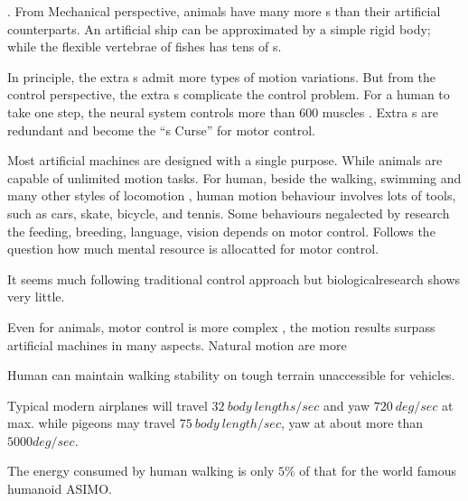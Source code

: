 \begin{itemize}
.
From Mechanical perspective, animals have many more {\dof}s than their artificial counterparts.
An artificial ship can be approximated by a simple rigid body; while the flexible vertebrae of fishes has tens of {\dof}s.


In principle, the extra {\dof}s admit more types of motion variations. 
But from the control perspective, the extra {\dof}s complicate the control problem. 
For a human to take one step,  the neural system controls more than 600 muscles .
Extra {\dof}s are redundant and become the ``{\dof}s Curse'' for motor control.
 
Most artificial machines are designed with a single purpose.
While animals are capable  of unlimited motion tasks.
For human, beside the walking, swimming and many other styles of locomotion , human motion behaviour involves lots of tools, such as cars, skate, bicycle, and tennis.
Some behaviours negalected by \cms research the feeding, breeding, language, vision depends on motor control. 
Follows the question how much mental resource is allocatted for motor control.

It seems much following traditional control approach but biologicalresearch shows very little.

Even for animals,  motor control is more complex , the motion results surpass artificial machines in many aspects.
Natural motion are more
\begin{enumerate} 

Human can maintain walking stability on tough terrain unaccessible for vehicles.

Typical modern airplanes will travel $32\: body\: lengths/sec$ and yaw $720\: deg/sec$ at max.
while pigeons may travel $75 \:body\: length / sec$, yaw at about more than $5000deg/sec$.

The energy consumed by human walking is only $5\%$ of that for the world famous humanoid ASIMO.
\end{enumerate}

\end{itemize}



